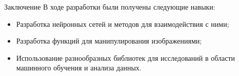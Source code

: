 \documentclass{beamer}
\begin{document}
\begin{frame}{Заключение}
  В ходе разработки были получены следующие навыки:
    \begin{itemize}
      \item Разработка нейронных сетей и методов для взаимодействия с ними;
      \item Разработка функций для манипулирования изображениями;
      \item Использование разнообразных библиотек для исследований в области машинного обучения и анализа данных.
    \end{itemize}
\end{frame}
\end{document}
